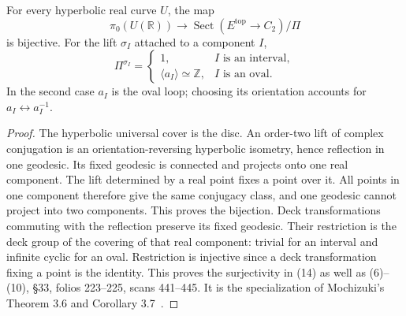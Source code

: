 \begin{theorem}
\label{C-discrete}
For every hyperbolic real curve $U$, the map
\[
 \pi_0(U(\mathbb R))\longrightarrow
 \operatorname{Sect}(E^{\mathrm{top}}\to C_2)/\Pi
\]
is bijective. For the lift $\sigma_I$ attached to a component $I$,
\[
 \Pi^{\sigma_I}=
 \begin{cases}
  1,& I\text{ is an interval},\\
  \langle a_I\rangle\simeq\mathbb Z,&I\text{ is an oval}.
 \end{cases}
\]
In the second case $a_I$ is the oval loop; choosing its
orientation accounts for $a_I\leftrightarrow a_I^{-1}$.
\end{theorem}
\begin{proof}
The hyperbolic universal cover is the disc.
An order-two lift of complex conjugation is an
orientation-reversing hyperbolic isometry, hence reflection
in one geodesic. Its fixed geodesic is connected and projects
onto one real component. The lift determined by a real
point fixes a point over it. All points in one component
therefore give the same conjugacy class, and one geodesic
cannot project into two components. This proves the bijection.
Deck transformations commuting with the reflection preserve
its fixed geodesic. Their restriction is the deck group of
the covering of that real component: trivial for an interval
and infinite cyclic for an oval. Restriction is injective
since a deck transformation fixing a point is the identity.
This proves the surjectivity in (14) as well as (6)--(10),
\S33, folios 223--225, scans 441--445. It is the
specialization of Mochizuki's Theorem 3.6 and
Corollary 3.7~\cite{MochizukiTopics}.
\end{proof}

